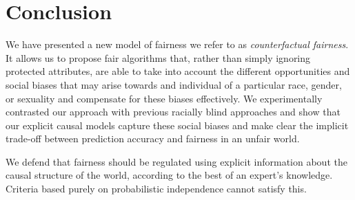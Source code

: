 \documentclass{article}
\begin{document}
\section{Conclusion}
\label{sec:conclusion}
We have presented a new model of fairness we refer to as {\em
  counterfactual fairness}. It allows us to propose fair
algorithms that, rather than simply ignoring protected attributes, are
able to take into account the different opportunities and social biases
that may arise towards and individual of a particular race, gender, or
sexuality and compensate for these biases effectively. We
experimentally contrasted our approach with previous racially blind
approaches and show that our explicit causal models capture these
social biases and make clear the implicit trade-off between
prediction accuracy and fairness in an unfair world.

We defend that fairness should be regulated using explicit
information about the causal structure of the world, according to the
best of an expert's knowledge. Criteria based purely on probabilistic
independence cannot satisfy this.



\end{document}
